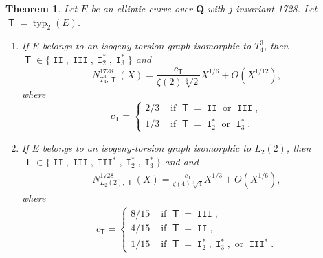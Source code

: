 \documentclass[10pt,a4paper]{amsart}
\newtheorem{thm}{Theorem}
\DeclareMathOperator{\I}{\mathtt{I}}
\DeclareMathOperator{\II}{\mathtt{II}}
\DeclareMathOperator{\III}{\mathtt{III}}
\newcommand{\Q}{\mathbf{Q}}
\newcommand{\T}{\operatorname{\mathsf{T}}}
\DeclareMathOperator{\typ}{{typ}}
\begin{document}
\begin{thm} \label{j1728_thm}
Let $E$ be an elliptic curve over $\Q$ with $j$-invariant 1728.  Let $\T = \typ_2(E)$.  
\begin{enumerate}
\item If $E$ belongs to an isogeny-torsion graph isomorphic to $T_4^3$, then \\
$\T \in \lbrace \II, \III, \I_2^*, \I_3^* \rbrace$ and 
\[
N_{T_4^3,\T}^{1728}(X) = \frac{c_{\T}}{\zeta(2)\sqrt[3]{2}}X^{1/6} + O(X^{1/12}),
\]
where
\[
c_{\T} = \begin{cases} 2/3 & \text{ if } \T =   \II \text{ or }\III, \\
1/3 & \text{ if } \T = \I_2^* \text{ or } \I_3^*. \end{cases}
\]
\item If $E$ belongs to an isogeny-torsion graph isomorphic to $L_2(2)$, then \\
$\T \in \lbrace \II, \III, \III^*, \I_2^*, \I_3^* \rbrace$ and 
and 
\begin{align*}
N_{L_2(2),\T}^{1728}(X) =  \frac{c_{\T}}{\zeta(4)\sqrt[3]{4}}X^{1/3} + O(X^{1/6}),
\end{align*}
where
\begin{align} \label{c_T_first_time}
c_{\T} = \begin{cases} 8/15 & \text{ if } \T = \III, \\
4/15 & \text{ if } \T = \II, \\
1/15 & \text{ if } \T = \I_2^*,  \I_3^*, \text{ or } \III^*. \end{cases}
\end{align}
\end{enumerate}
\end{thm} 
\end{document}
